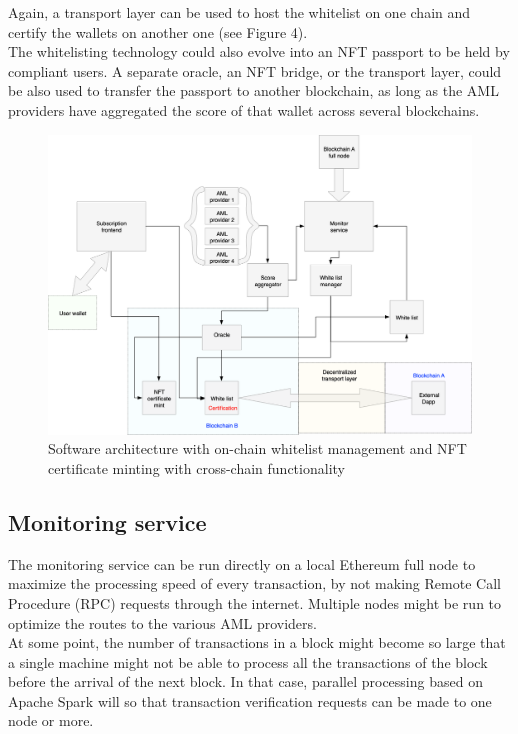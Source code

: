 ﻿\documentclass[a4paper]{article}
\begin{document}
Again, a transport layer can be used to host the whitelist on one chain and certify the wallets on another one (see Figure 4). \\

The whitelisting technology could also evolve into an NFT passport to be held by compliant users. A separate oracle, an NFT bridge, or the transport layer, could be also used to transfer the passport to another blockchain, as long as the AML providers have aggregated the score of that wallet across several blockchains. \\
  
\begin{figure}[!h]
\centering
\includegraphics[scale=0.35]{architecture_v2_crosschain_trim.png}
\caption{Software architecture with on-chain whitelist management and NFT certificate minting with cross-chain functionality}
\label{onchain}
\end{figure}


\subsection{Monitoring service}
The monitoring service can be run directly on a local Ethereum full node to maximize the processing speed of every transaction, by not making Remote Call Procedure (RPC) requests through the internet. Multiple nodes might be run to optimize the routes to the various AML providers. \\

At some point, the number of transactions in a block might become so large that a single machine might not be able to process all the transactions of the block before the arrival of the next block. In that case, parallel processing based on Apache Spark will so that transaction verification requests can be made to one node or more. \\
\end{document}
